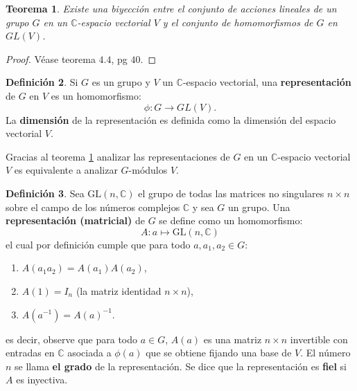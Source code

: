 \documentclass[12pt]{book}
\newtheorem{theorem}{Teorema}[section]
\theoremstyle{definition}
\newtheorem{definition}[theorem]{Definición}
\newcounter{in}
\newcounter{ini}
\begin{document}
\begin{theorem}
  \label{acc_lin}
  Existe una biyección entre el conjunto de acciones lineales de un
  grupo $G$ en un $\mathbb{C}$-espacio vectorial $V$ y el conjunto de
  homomorfismos de $G$ en $GL(V)$.
\end{theorem}
\begin{proof}
Véase \cite{liebeck} teorema $4.4$, pg $40$.
\end{proof}
\begin{definition}
  \label{representation}
  Si $G$ es un grupo y $V$ un $\mathbb{C}$-espacio vectorial, una
  \textbf{representación} de $G$ en $V$ es un homomorfismo:
  $$\phi \colon G \to GL(V).$$
  La \textbf{dimensión} de la representación es
  definida como la dimensión del espacio vectorial $V$.
\end{definition}
Gracias al teorema \ref{acc_lin} analizar las representaciones de
  $G$ en un $\mathbb{C}$-espacio vectorial $V$ es equivalente a
  analizar $G$-módulos $V$. 
\begin{definition}
Sea $ \mathrm{GL}(n,\mathbb{C})$ el grupo de todas las matrices no
singulares $n\times n$ sobre el campo de los números complejos
$\mathbb{C}$ y sea $G$ un grupo. Una \textbf{representación (matricial)}
de $G$ se define como un homomorfismo:
\begin{equation*}
  A \colon a \mapsto \mathrm{GL}(n,\mathbb{C})
\end{equation*}
el cual por definición cumple que para todo $a, a_1,a_2 \in G$:
\begin{enumerate}
\item $A\left(a_1a_2\right)=A\left(a_1\right)A\left(a_2\right)$,
\item $A\left(1\right)=I_{n}$ (la matriz identidad $n\times n$),
\item $A\left(a^{-1}\right)=A\left(a\right)^{-1}$.
\end{enumerate}
es decir, observe que para todo $a \in G$, $A(a)$ es una matriz
$n \times n$ invertible con entradas en $\mathbb{C}$ asociada a
$\phi(a)$ que se obtiene fijando una base de $V$. El número $n$ se
llama \textbf{el grado} de la representación. Se dice que la
representación es \textbf{fiel} si $A$ es inyectiva.
\end{definition} 
\end{document}
